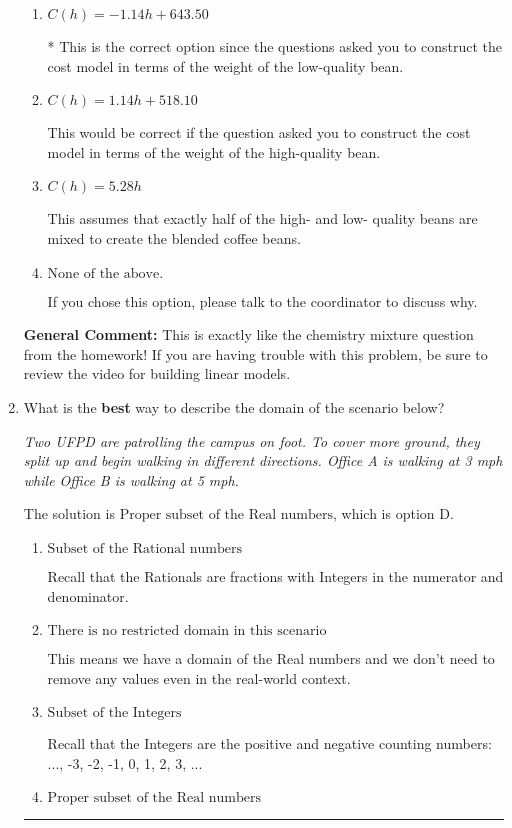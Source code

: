 \documentclass{extbook}[14pt]
\newcommand{\litem}[1]{\item #1

\rule{\textwidth}{0.4pt}}
\begin{document}
\begin{enumerate}
{\begin{enumerate}[label=\Alph*.]
This models the cost of the low-quality bean only, not the blended beans.
\item \( C(h) = -1.14 h + 643.50 \)

* This is the correct option since the questions asked you to construct the cost model in terms of the weight of the low-quality bean.
\item \( C(h) = 1.14 h + 518.10 \)

This would be correct if the question asked you to construct the cost model in terms of the weight of the high-quality bean.
\item \( C(h) = 5.28 h \)

This assumes that exactly half of the high- and low- quality beans are mixed to create the blended coffee beans.
\item \( \text{None of the above.} \)

If you chose this option, please talk to the coordinator to discuss why.
\end{enumerate}

\textbf{General Comment:} This is exactly like the chemistry mixture question from the homework! If you are having trouble with this problem, be sure to review the video for building linear models.
}
\litem{
What is the \textbf{best} way to describe the domain of the scenario below?

\begin{center}
    \textit{ Two UFPD are patrolling the campus on foot. To cover more ground, they split up and begin walking in different directions. Office A is walking at 3 mph while Office B is walking at 5 mph. }
\end{center}
The solution is \( \text{Proper subset of the Real numbers} \), which is option D.\begin{enumerate}[label=\Alph*.]
\item \( \text{Subset of the Rational numbers} \)

Recall that the Rationals are fractions with Integers in the numerator and denominator.
\item \( \text{There is no restricted domain in this scenario} \)

This means we have a domain of the Real numbers and we don't need to remove any values even in the real-world context.
\item \( \text{Subset of the Integers} \)

Recall that the Integers are the positive and negative counting numbers: ..., -3, -2, -1, 0, 1, 2, 3, ... 
\item \( \text{Proper subset of the Real numbers} \)


\end{enumerate}}
\end{enumerate}
\end{document}
